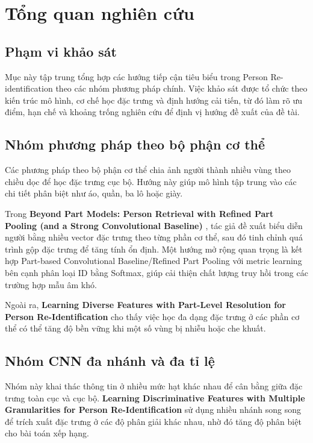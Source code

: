 \section{Tổng quan nghiên cứu}

\subsection{Phạm vi khảo sát}
Mục này tập trung tổng hợp các hướng tiếp cận tiêu biểu trong Person Re-identification theo các nhóm phương pháp chính. Việc khảo sát được tổ chức theo kiến trúc mô hình, cơ chế học đặc trưng và định hướng cải tiến, từ đó làm rõ ưu điểm, hạn chế và khoảng trống nghiên cứu để định vị hướng đề xuất của đề tài.

\subsection{Nhóm phương pháp theo bộ phận cơ thể}
Các phương pháp theo bộ phận cơ thể chia ảnh người thành nhiều vùng theo chiều dọc để học đặc trưng cục bộ. Hướng này giúp mô hình tập trung vào các chi tiết phân biệt như áo, quần, ba lô hoặc giày.

Trong \textbf{Beyond Part Models: Person Retrieval with Refined Part Pooling (and a Strong Convolutional Baseline)} \cite{sun2018modelspersonretrievalrefined}, tác giả đề xuất biểu diễn người bằng nhiều vector đặc trưng theo từng phần cơ thể, sau đó tinh chỉnh quá trình gộp đặc trưng để tăng tính ổn định. Một hướng mở rộng quan trọng là kết hợp Part-based Convolutional Baseline/Refined Part Pooling với metric learning bên cạnh phân loại ID bằng Softmax, giúp cải thiện chất lượng truy hồi trong các trường hợp mẫu âm khó.

Ngoài ra, \textbf{Learning Diverse Features with Part-Level Resolution for Person Re-Identification} \cite{xie2020learningdiversefeaturespartlevel} cho thấy việc học đa dạng đặc trưng ở các phần cơ thể có thể tăng độ bền vững khi một số vùng bị nhiễu hoặc che khuất.

\subsection{Nhóm CNN đa nhánh và đa tỉ lệ}
Nhóm này khai thác thông tin ở nhiều mức hạt khác nhau để cân bằng giữa đặc trưng toàn cục và cục bộ. \textbf{Learning Discriminative Features with Multiple Granularities for Person Re-Identification} \cite{Wang_2018} sử dụng nhiều nhánh song song để trích xuất đặc trưng ở các độ phân giải khác nhau, nhờ đó tăng độ phân biệt cho bài toán xếp hạng.

